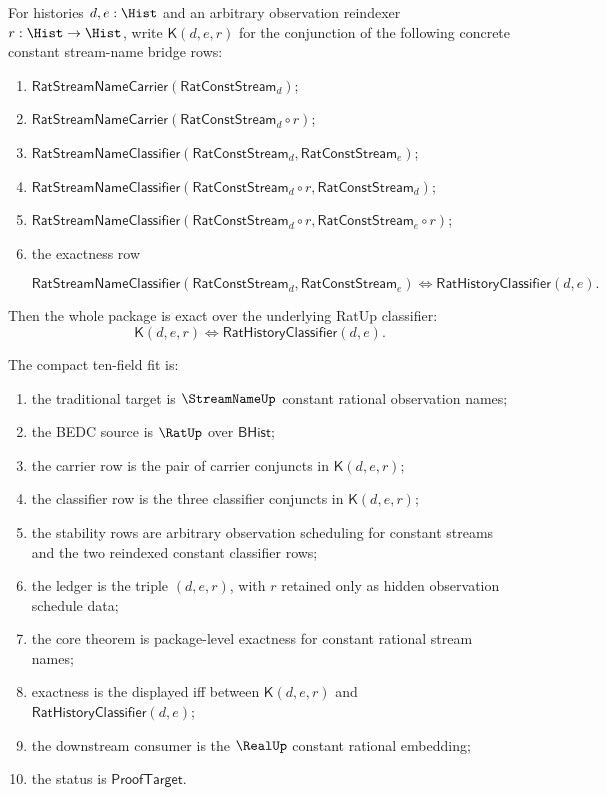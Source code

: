 \begin{theorem}
\label{thm:rat-stream-name-constant-bridge-package-exactness}
For histories $d,e:\Hist$ and an arbitrary observation reindexer
$r:\Hist\to\Hist$, write $\mathsf{K}(d,e,r)$ for the conjunction of the following concrete
constant stream-name bridge rows:
\begin{enumerate}
  \item $\mathsf{RatStreamNameCarrier}(\mathsf{RatConstStream}_d)$;
  \item $\mathsf{RatStreamNameCarrier}(\mathsf{RatConstStream}_d\circ r)$;
  \item $\mathsf{RatStreamNameClassifier}(\mathsf{RatConstStream}_d,
  \mathsf{RatConstStream}_e)$;
  \item $\mathsf{RatStreamNameClassifier}(\mathsf{RatConstStream}_d\circ r,
  \mathsf{RatConstStream}_d)$;
  \item $\mathsf{RatStreamNameClassifier}(\mathsf{RatConstStream}_d\circ r,
  \mathsf{RatConstStream}_e\circ r)$;
  \item the exactness row

  $$
  \mathsf{RatStreamNameClassifier}(\mathsf{RatConstStream}_d,
  \mathsf{RatConstStream}_e)
  \Longleftrightarrow
  \mathsf{RatHistoryClassifier}(d,e).
  $$

\end{enumerate}
Then the whole package is exact over the underlying RatUp classifier:
$$
\mathsf{K}(d,e,r)
\Longleftrightarrow
\mathsf{RatHistoryClassifier}(d,e).
$$

The compact ten-field fit is:
\begin{enumerate}
  \item the traditional target is $\StreamNameUp$ constant rational observation
  names;
  \item the BEDC source is $\RatUp$ over $\mathsf{BHist}$;
  \item the carrier row is the pair of carrier conjuncts in
  $\mathsf{K}(d,e,r)$;
  \item the classifier row is the three classifier conjuncts in
  $\mathsf{K}(d,e,r)$;
  \item the stability rows are arbitrary observation scheduling for constant
  streams and the two reindexed constant classifier rows;
  \item the ledger is the triple $(d,e,r)$, with $r$ retained only as hidden
  observation schedule data;
  \item the core theorem is package-level exactness for constant rational
  stream names;
  \item exactness is the displayed iff between $\mathsf{K}(d,e,r)$ and
  $\mathsf{RatHistoryClassifier}(d,e)$;
  \item the downstream consumer is the $\RealUp$ constant rational embedding;
  \item the status is $\mathsf{ProofTarget}$.
\end{enumerate}
\end{theorem}
